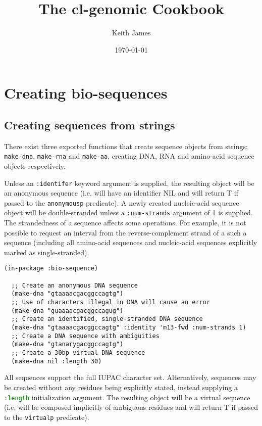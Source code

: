\documentclass[a4paper, 12pt]{article}
\begin{document}
\title{The cl-genomic Cookbook}
\author{Keith James}
\date{\today}

\maketitle

\section{Creating bio-sequences}
\label{sec:create-bioseq}

\subsection{Creating sequences from strings}
\label{sec:create-bioseq-str}

There exist three exported functions that create sequence objects from
strings; \lstinline!make-dna!, \lstinline!make-rna! and
\lstinline!make-aa!, creating DNA, RNA and amino-acid sequence objects
respectively.

Unless an \lstinline[language=Lisp]!:identifer! keyword argument is
supplied, the resulting object will be an anonymous sequence
(i.e. will have an identifier NIL and will return T if passed to the
\lstinline!anonymousp! predicate). A newly created nucleic-acid
sequence object will be double-stranded unless a
\lstinline[language=Lisp]!:num-strands! argument of 1 is supplied. The
strandedness of a sequence affects some operations. For example, it is
not possible to request an interval from the reverse-complement strand
of a such a sequence (including all amino-acid sequences and
nucleic-acid sequences explicitly marked as single-stranded).

\lstset{basicstyle=\small, language=Lisp}
\begin{lstlisting}[caption={Making DNA sequences},label=make-dna]
  (in-package :bio-sequence)
  
  ;; Create an anonymous DNA sequence
  (make-dna "gtaaaacgacggccagtg")
  ;; Use of characters illegal in DNA will cause an error
  (make-dna "guaaaacgacggccagug")
  ;; Create an identified, single-stranded DNA sequence 
  (make-dna "gtaaaacgacggccagtg" :identity 'm13-fwd :num-strands 1)
  ;; Create a DNA sequence with ambiguities
  (make-dna "gtanarygacggccagtg")
  ;; Create a 30bp virtual DNA sequence
  (make-dna nil :length 30)
\end{lstlisting}

All sequences support the full IUPAC character set. Alternatively,
sequences may be created without any residues being explicitly stated,
instead supplying a \lstinline[language=Lisp]!:length! initialization
argument. The resulting object will be a virtual sequence (i.e. will
be composed implicitly of ambiguous residues and will return T if
passed to the \lstinline!virtualp! predicate).
\end{document}
